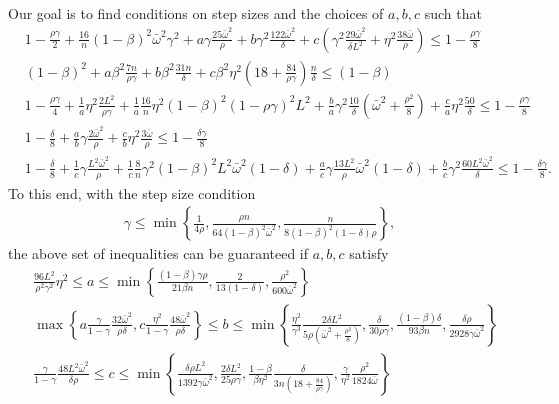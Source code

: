 \documentclass[10pt]{article} %
\theoremstyle{plain}
\theoremstyle{definition}
\theoremstyle{remark}
\newcommand{\bw}{\bar{\omega}}
\newcommand{\nl}{\nonumber\\}
\begin{document}
Our goal is to find conditions on step sizes and the choices of $a,b,c$ such that
\begin{equation} \label{eq:big_inequality_sys}
\begin{aligned}
    & 1 - \frac{\rho\gamma}{2} + \frac{16}{n} (1-\beta)^2\bw^2\gamma^2 + a\gamma\frac{25\bw^2}{\rho} + b\gamma^2 \frac{122\bw^2}{\delta} + c(\gamma^2\frac{29\bw^2}{\delta L^2} + \eta^2 \frac{38\bw}{\rho}) \leq 1 - \frac{\rho\gamma}{8}
    \nl & (1-\beta)^2 + a\beta^2\frac{7n}{\rho\gamma} + b\beta^2 \frac{31n}{\delta} + c\beta^2\eta^2 (18 + \frac{84}{\rho\gamma}) \frac{n}{\delta} \leq (1-\beta)
    \nl & 1-\frac{\rho\gamma}{4} + \frac{1}{a}\eta^2\frac{2L^2}{\rho\gamma} + \frac{1}{a} \frac{16}{n} \eta^2(1-\beta)^2 (1-\rho\gamma)^2 L^2 + \frac{b}{a}\gamma^2 \frac{10}{\delta} (\bw^2 + \frac{\rho^2}{8}) + \frac{c}{a}\eta^2\frac{50}{\delta} \leq 1 - \frac{\rho\gamma}{8}
    \nl & 1-\frac{\delta}{8} + \frac{a}{b}\gamma\frac{2\bw^2}{\rho} +  \frac{c}{b}\eta^2\frac{3\bw}{\rho} \leq 1 - \frac{\delta\gamma}{8}
    \nl & 1-\frac{\delta}{8} + \frac{1}{c}\gamma\frac{L^2\bw^2}{\rho} + \frac{1}{c} \frac{8}{n} \gamma^2(1-\beta)^2L^2\bw^2(1-\delta) + \frac{a}{c}\gamma\frac{13L^2}{\rho}\bw^2(1-\delta) + \frac{b}{c}\gamma^2 \frac{60L^2\bw^2}{\delta} \leq 1 - \frac{\delta\gamma}{8}.
\end{aligned}  
\end{equation}
To this end, with the step size condition 
\begin{align} \label{eq:whole_step_1st}
    \gamma \leq \min \left\{ \frac{1}{4\rho}, \frac{\rho n} {64(1-\beta)^2\bw^2}, \frac{n}{8(1-\beta)^2(1-\delta)\rho}\right\}, \tag{S1}
\end{align}
the above set of inequalities can be guaranteed if $a,b,c$ satisfy 
\begin{align}
    & \frac{96L^2}{\rho^2\gamma^2}\eta^2 \leq a \leq \min \left\{\frac{(1-\beta)\gamma\rho}{21\beta n}, \frac{2}{13(1-\delta)}, \frac{\rho^2}{600\bw^2}\right\} \label{eq:a_bounds}
    \\ &\max \left\{ a \frac{\gamma}{1-\gamma}\frac{32\bw^2}{\rho\delta}, c\frac{\eta^2}{1-\gamma}\frac{48\bw^2}{\rho\delta} \right\} \leq b 
    \leq \min \left\{ \frac{\eta^2}{\gamma^3} \frac{2\delta L^2}{5\rho (\bw^2 + \frac{\rho^2}{8})}, \frac{\delta}{30 \rho\gamma}, \frac{(1-\beta)\delta}{93\beta n}, \frac{\delta\rho}{2928\gamma\bw^2}\right\} \label{eq:b_bounds}
    \\ & \frac{\gamma}{1-\gamma} \frac{48L^2\bw^2}{\delta\rho} \leq c \leq \min \left\{ \frac{\delta\rho L^2}{1392 \gamma \bw^2}, \frac{2\delta L^2}{25\rho\gamma}, \frac{1-\beta}{\beta\eta^2} \frac{\delta}{3n (18+\frac{84}{\rho\gamma})}, \frac{\gamma}{\eta^2}\frac{\rho^2}{1824\bw}\right\} \label{eq:c_bounds}
\end{align}
\end{document}
